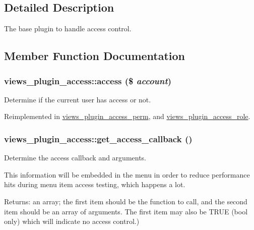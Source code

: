 \subsection{Detailed Description}
The base plugin to handle access control. 

\subsection{Member Function Documentation}
\hypertarget{classviews__plugin__access_d24d38c1b1a1bd7527b2b96a2103cede}{
\subsubsection[{access}]{\setlength{\rightskip}{0pt plus 5cm}views\_\-plugin\_\-access::access (\$ {\em account})}}
\label{classviews__plugin__access_d24d38c1b1a1bd7527b2b96a2103cede}


Determine if the current user has access or not. 

Reimplemented in \hyperlink{classviews__plugin__access__perm_c5b655153815ade74513b1af48c18cad}{views\_\-plugin\_\-access\_\-perm}, and \hyperlink{classviews__plugin__access__role_8de6032d940b90e06820cdbd9a15a51c}{views\_\-plugin\_\-access\_\-role}.\hypertarget{classviews__plugin__access_d4038a32fccc6a662a74f437d0bf6a23}{
\subsubsection[{get\_\-access\_\-callback}]{\setlength{\rightskip}{0pt plus 5cm}views\_\-plugin\_\-access::get\_\-access\_\-callback ()}}
\label{classviews__plugin__access_d4038a32fccc6a662a74f437d0bf6a23}


Determine the access callback and arguments.

This information will be embedded in the menu in order to reduce performance hits during menu item access testing, which happens a lot.

\begin{Desc}
\item[Returns:]an array; the first item should be the function to call, and the second item should be an array of arguments. The first item may also be TRUE (bool only) which will indicate no access control.) \end{Desc}


